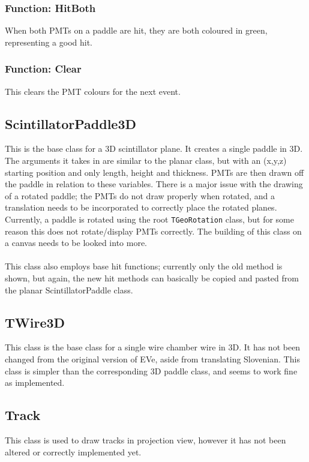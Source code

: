 \documentclass[12pt]{article}
\numberwithin{equation}{section}
\begin{document}
\subsubsection{Function: HitBoth}
When both PMTs on a paddle are hit, they are both coloured in green, representing a good hit.

\subsubsection{Function: Clear}
This clears the PMT colours for the next event.

\subsection{ScintillatorPaddle3D}
This is the base class for a 3D scintillator plane. It creates a single paddle in 3D. The arguments it takes in are similar to the planar class, but with an (x,y,z) starting position and only length, height and thickness. PMTs are then drawn off the paddle in relation to these variables. There is a major issue with the drawing of a rotated paddle; the PMTs do not draw properly when rotated, and a translation needs to be incorporated to correctly place the rotated planes. Currently, a paddle is rotated using the root \texttt{TGeoRotation} class, but for some reason this does not rotate/display PMTs correctly. The building of this class on a canvas needs to be looked into more.
\\
\\
This class also employs base hit functions; currently only the old method is shown, but again, the new hit methods can basically be copied and pasted from the planar ScintillatorPaddle class.


\subsection{TWire3D}
This class is the base class for a single wire chamber wire in 3D. It has not been changed from the original version of EVe, aside from translating Slovenian. This class is simpler than the corresponding 3D paddle class, and seems to work fine as implemented.

\subsection{Track}
This class is used to draw tracks in projection view, however it has not been altered or correctly implemented yet.
\end{document}

